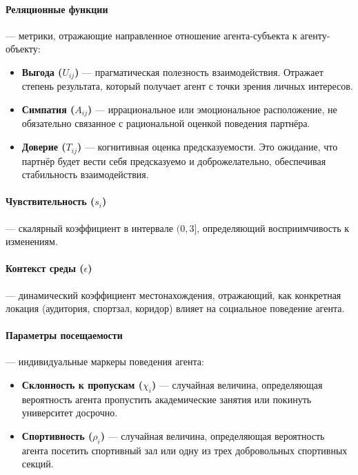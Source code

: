 \documentclass[12pt]{article}
\begin{document}
\paragraph{Реляционные функции} — метрики, отражающие направленное отношение агента-субъекта к агенту-объекту:
\begin{itemize}
    \item \textbf{Выгода (\(U_{ij}\))} — прагматическая полезность взаимодействия. Отражает степень результата, который получает агент с точки зрения личных интересов.
    \item \textbf{Симпатия (\(A_{ij}\))} — иррациональное или эмоциональное расположение, не обязательно связанное с рациональной оценкой поведения партнёра.
    \item \textbf{Доверие (\(T_{ij}\))} — когнитивная оценка предсказуемости. Это ожидание, что партнёр будет вести себя предсказуемо и доброжелательно, обеспечивая стабильность взаимодействия.
\end{itemize}

\paragraph{Чувствительность (\(s_i\))} — скалярный коэффициент в интервале \((0, 3]\), определяющий восприимчивость к изменениям.

\paragraph{Контекст среды (\(\epsilon\))} — динамический коэффициент местонахождения, отражающий, как конкретная локация (аудитория, спортзал, коридор) влияет на социальное поведение агента.

\paragraph{Параметры посещаемости} — индивидуальные маркеры поведения агента:
\begin{itemize}
    \item \textbf{Склонность к пропускам (\(\chi_i\))} — случайная величина, определяющая вероятность агента пропустить академические занятия или покинуть университет досрочно.
    \item \textbf{Спортивность (\(\rho_i\))} — случайная величина, определяющая вероятность агента посетить спортивный зал или одну из трех добровольных спортивных секций.
\end{itemize}
\end{document}
